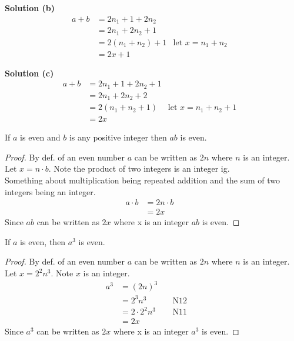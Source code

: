 \documentclass[6pt]{article}
\begin{document}
\textbf{Solution (b)}
\begin{align*}
a + b &= 2n_1 + 1 + 2n_2 & \\
&= 2n_1 + 2n_2 + 1 & \\
&= 2(n_1 + n_2) + 1 & \text{let } x = n_1 + n_2 & \\
&= 2x + 1
\end{align*}

\textbf{Solution (c)}
\begin{align*}
a + b &= 2n_1 + 1 + 2n_2 + 1 & \\
&= 2n_1 + 2n_2 + 2 & \\
&= 2(n_1 + n_2 + 1) & \text{let } x = n_1 + n_2 + 1 & \\
&= 2x
\end{align*}


\begin{tcolorbox}[title=Problem 2, breakable]
If $a$ is even and $b$ is any positive integer then $ab$ is even.
\end{tcolorbox}

\begin{proof}
By def. of an even number $a$ can be written as $2n$ where $n$ is an integer. \\
Let $x = n \cdot b$. Note the product of two integers is an integer ig. \\ 
Something about multiplication being repeated addition and the sum of two integers being an integer.
\begin{align*}
    a \cdot b &= 2n \cdot b & \\
    &= 2x & 
\end{align*}
Since $ab$ can be written as $2x$ where x is an integer $ab$ is even.
\end{proof}

\begin{tcolorbox}[title=Problem 3, breakable]
If $a$ is even, then $a^3$ is even.
\end{tcolorbox}

\begin{proof}
By def. of an even number $a$ can be written as $2n$ where $n$ is an integer. \\
Let $x = 2^2 n^3$. Note $x$ is an integer. 
\begin{align*}
a^3 &= {(2n)}^3 & \quad \text{} && \\
&= 2^3 n^3 & \quad \text{N12} && \\
&= 2 \cdot 2^2 n^3 & \quad \text{N11} && \\
&= 2 x & \quad \text{}
\end{align*}
Since $a^3$ can be written as $2x$ where x is an integer $a^3$ is even.
\end{proof}
\end{document}
